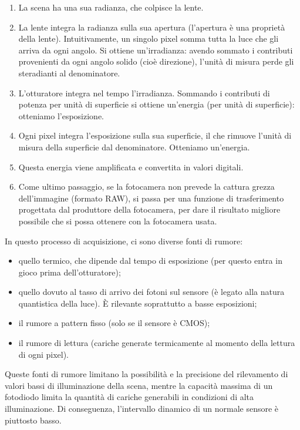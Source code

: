 \documentclass[a4paper,11pt]{article}
\begin{document}
\begin{enumerate}
    \item La scena ha una sua radianza, che colpisce la lente.
    \item La lente integra la radianza sulla sua apertura (l'apertura è una proprietà della lente). Intuitivamente, un singolo pixel somma tutta la luce che gli arriva da ogni angolo.
    Si ottiene un'irradianza: avendo sommato i contributi provenienti da ogni angolo solido (cioè direzione), l'unità di misura perde gli steradianti al denominatore.
    \item L'otturatore integra nel tempo l'irradianza. Sommando i contributi di potenza per unità di superficie si ottiene un'energia (per unità di superficie): otteniamo l'esposizione.
    \item Ogni pixel integra l'esposizione sulla sua superficie, il che rimuove l'unità di misura della superficie dal denominatore. Otteniamo un'energia.
    \item Questa energia viene amplificata e convertita in valori digitali.
    \item Come ultimo passaggio, se la fotocamera non prevede la cattura grezza dell'immagine (formato RAW), si passa per una funzione di trasferimento progettata dal produttore della fotocamera,
    per dare il risultato migliore possibile che si possa ottenere con la fotocamera usata.
\end{enumerate}

\par
In questo processo di acquisizione, ci sono diverse fonti di rumore:
\begin{itemize}
    \item quello termico, che dipende dal tempo di esposizione (per questo entra in gioco prima dell'otturatore);
    \item quello dovuto al tasso di arrivo dei fotoni sul sensore (è legato alla natura quantistica della luce). È rilevante soprattutto a basse esposizioni;
    \item il rumore a pattern fisso (solo se il sensore è CMOS);
    \item il rumore di lettura (cariche generate termicamente al momento della lettura di ogni pixel).
\end{itemize}

Queste fonti di rumore limitano la possibilità e la precisione del rilevamento di valori bassi di illuminazione della scena, mentre la capacità massima di un fotodiodo limita la quantità
di cariche generabili in condizioni di alta illuminazione. Di conseguenza, l'intervallo dinamico di un normale sensore è piuttosto basso.
\end{document}
